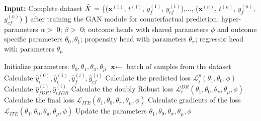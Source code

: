 \documentclass{amia}
\begin{document}
\begin{algorithm}[t]
	\caption{Training of the doubly robust multitask network for ITE estimation} 
	\label{algo: DR_model}
	\hspace*{\algorithmicindent} \textbf{Input:}  {Complete dataset \textbf{$\Tilde{X}$} = \{($\textbf{x}^{(1)}$, $t^{(1)}$, $y_f^{(1)}$, $y_{cf}^{(1)}$),...,
	($\textbf{x}^{(n)}$, $t^{(n)}$, $y_f^{(n)}$, $y_{cf}^{(n)}$) \} after training the GAN module for counterfactual prediction; hyper-parameters $\alpha > $  0; $\beta > $  0; outcome heads with shared parameters $\phi$ and outcome specific parameters $\theta_0, \theta_1$; propensity head with parameters $\theta_\pi$; regressor head with parameters $\theta_\mu$}
	\begin{algorithmic}[1]
        \State Initialize parameters: $\theta_0, \theta_1, \theta_\pi, \theta_\mu$
            \State $\textbf{x} \leftarrow$ batch of samples from the dataset  
            \State Calculate $\hat{y}_i^{(0)}, \hat{y}_i^{(1)}, \hat{y}_f^{(i)}, \hat{y}_{cf}^{(i)}$
            \State Calculate the predicted loss $\mathcal{L}_i^p(\theta_1, \theta_0, \phi)$
            \State Calculate $\hat{y}_{fDR}^{(i)}, \hat{y}_{cfDR}^{(i)}$
            \State Calculate the doubly Robust loss $\mathcal{L}_i^{DR}(\theta_1, \theta_0, \theta_\pi, \theta_\mu, \phi)$
            \State Calculate the final loss $\mathcal{L}_{ITE}(\theta_1, \theta_0, \theta_\pi, \theta_\mu, \phi)$
            \State Calculate gradients of the loss $\mathcal{L}_{ITE}(\theta_1, \theta_0, \theta_\pi, \theta_\mu, \phi)$
            \State Update the parameters $\theta_1, \theta_0, \theta_\pi, \theta_\mu, \phi$
        \EndWhile
        
	\end{algorithmic} 
\end{algorithm}
\end{document}

